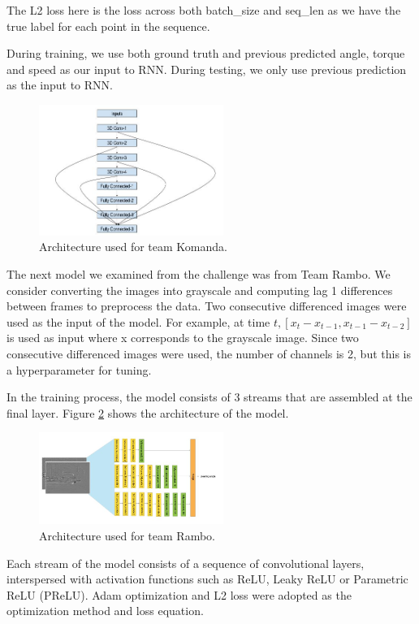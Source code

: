 \documentclass[10pt,twocolumn,letterpaper]{article}
\begin{document}
The L2 loss here is the loss across both batch\_size and seq\_len as we have the true label for each point in the sequence.

During training, we use both ground truth and previous predicted angle, torque and speed as our input to RNN. During testing, we only use previous prediction as the input to RNN.
\begin{figure}[!htb]
	\includegraphics[width=6cm]{Komanda.JPG}
	\centering
	\caption{Architecture used for team Komanda.}
	\label{komanda}
\end{figure}

The next model we examined from the challenge was from Team Rambo. We consider converting the images into grayscale and computing lag 1 differences between frames to preprocess the data. Two consecutive differenced images were used as the input of the model. For example, at time $t, [x_{t} - x_{t-1}, x_{t-1} - x_{t-2}]$ is used as input where x corresponds to the grayscale image. Since two consecutive differenced images were used, the number of channels is 2, but this is a hyperparameter for tuning. 

In the training process, the model consists of 3 streams that are assembled at the final layer. Figure \ref{rambo} shows the architecture of the model. 
\begin{figure}[!htb]
	\includegraphics[width=6cm]{rambo.JPG}
	\centering
	\caption{Architecture used for team Rambo.}
	\label{rambo}
\end{figure}
Each stream of the model consists of a sequence of convolutional layers, interspersed with activation functions such as ReLU, Leaky ReLU or Parametric ReLU (PReLU). Adam optimization and L2 loss were adopted as the optimization method and loss equation.
\end{document}
